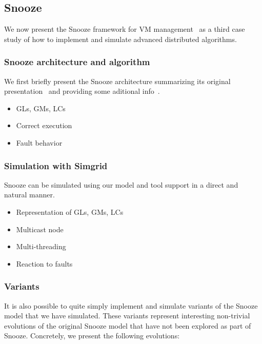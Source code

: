 \subsection{Snooze}
\label{subsec:snooze}


We now present the Snooze framework for VM
management~\cite{feller:ccgrid12} as a third case study of how
to implement and simulate advanced distributed algorithms.

\subsubsection{Snooze architecture and  algorithm}

We first briefly present the Snooze architecture summarizing its
original presentation~\cite{feller:ccgrid12} and providing some
aditional info~\cite{snoozedev14,snoozeweb}.

\begin{itemize}
  \item GLs, GMs, LCs
  \item Correct execution
  \item Fault behavior
\end{itemize}

\subsubsection{Simulation with Simgrid}

Snooze can be simulated using our model and tool support in a direct
and natural manner.

\begin{itemize}
  \item Representation of GLs, GMs, LCs
  \item Multicast node
  \item Multi-threading
  \item Reaction to faults
\end{itemize}

\subsubsection{Variants}

It is also possible to quite simply implement and simulate variants of
the Snooze model that we have simulated. These variants represent
interesting non-trivial evolutions of the original Snooze model that
have not been explored as part of Snooze. Concretely, we present the
following evolutions:

